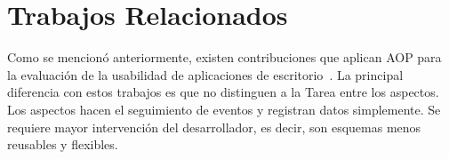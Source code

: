 \section{Trabajos Relacionados}
\label{sec:trabajos_relacionados}
Como se mencionó anteriormente, existen contribuciones que aplican AOP para la evaluación de la usabilidad de aplicaciones de escritorio~\cite{TM2006,ST2010,HBS2011,TAO2008,TAO2012,BGO+2009,HDC2009}. La principal diferencia con estos trabajos es que no distinguen a la Tarea entre los aspectos. Los aspectos hacen el seguimiento de eventos y registran datos simplemente. Se requiere mayor intervención del desarrollador, es decir, son esquemas menos reusables y flexibles.




